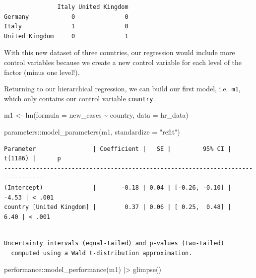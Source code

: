 \documentclass[
  letterpaper,
  DIV=11,
  numbers=noendperiod]{scrreprt}
\newenvironment{Shaded}{\begin{snugshade}}{\end{snugshade}}
\newcommand{\AttributeTok}[1]{\textcolor[rgb]{0.40,0.45,0.13}{#1}}
\newcommand{\FunctionTok}[1]{\textcolor[rgb]{0.28,0.35,0.67}{#1}}
\newcommand{\NormalTok}[1]{\textcolor[rgb]{0.00,0.23,0.31}{#1}}
\newcommand{\OtherTok}[1]{\textcolor[rgb]{0.00,0.23,0.31}{#1}}
\newcommand{\SpecialCharTok}[1]{\textcolor[rgb]{0.37,0.37,0.37}{#1}}
\newcommand{\StringTok}[1]{\textcolor[rgb]{0.13,0.47,0.30}{#1}}
\begin{document}
\begin{verbatim}
               Italy United Kingdom
Germany            0              0
Italy              1              0
United Kingdom     0              1
\end{verbatim}

With this new dataset of three countries, our regression would include
more control variables because we create a new control variable for each
level of the factor (minus one level!).

Returning to our hierarchical regression, we can build our first model,
i.e.~\texttt{m1}, which only contains our control variable
\texttt{country}.

\begin{Shaded}
\begin{Highlighting}[]
\NormalTok{m1 }\OtherTok{\textless{}{-}} \FunctionTok{lm}\NormalTok{(}\AttributeTok{formula =}\NormalTok{ new\_cases }\SpecialCharTok{\textasciitilde{}}\NormalTok{ country,}
         \AttributeTok{data =}\NormalTok{ hr\_data)}

\NormalTok{parameters}\SpecialCharTok{::}\FunctionTok{model\_parameters}\NormalTok{(m1, }\AttributeTok{standardize =} \StringTok{"refit"}\NormalTok{)}
\end{Highlighting}
\end{Shaded}

\begin{verbatim}
Parameter                | Coefficient |   SE |         95% CI | t(1186) |      p
---------------------------------------------------------------------------------
(Intercept)              |       -0.18 | 0.04 | [-0.26, -0.10] |   -4.53 | < .001
country [United Kingdom] |        0.37 | 0.06 | [ 0.25,  0.48] |    6.40 | < .001
\end{verbatim}

\begin{verbatim}

Uncertainty intervals (equal-tailed) and p-values (two-tailed)
  computed using a Wald t-distribution approximation.
\end{verbatim}

\begin{Shaded}
\begin{Highlighting}[]
\NormalTok{performance}\SpecialCharTok{::}\FunctionTok{model\_performance}\NormalTok{(m1) }\SpecialCharTok{|\textgreater{}}
  \FunctionTok{glimpse}\NormalTok{()}
\end{Highlighting}
\end{Shaded}
\end{document}
